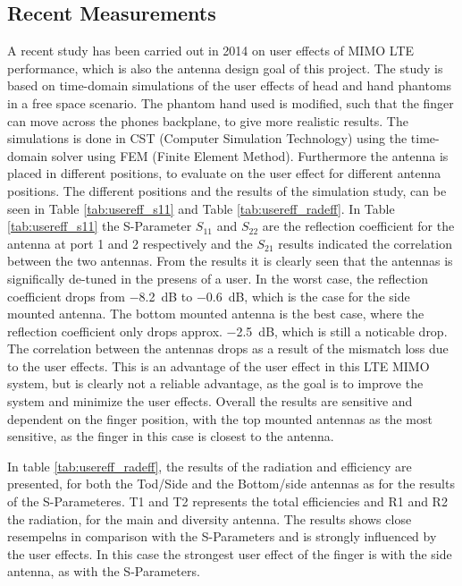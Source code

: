 \subsection{Recent Measurements}
A recent study has been carried out in 2014 on user effects of MIMO LTE performance, which is also the antenna design goal of this project. The study is based on time-domain simulations of the user effects of head and hand phantoms in a free space scenario. The phantom hand used is modified, such that the finger can move across the phones backplane, to give more realistic results. The simulations is done in CST (Computer Simulation Technology) using the time-domain solver using FEM (Finite Element Method). Furthermore the antenna is placed in different positions, to evaluate on the user effect for different antenna positions. The different positions and the results of the simulation study, can be seen in Table \ref{tab:usereff_s11} and Table \ref{tab:usereff_radeff}. In Table \ref{tab:usereff_s11} the S-Parameter $S_{11}$ and $S_{22}$ are the reflection coefficient for the antenna at port 1 and 2 respectively and the $S_{21}$ results indicated the correlation between the two antennas. From the results it is clearly seen that the antennas is significally de-tuned in the presens of a user. In the worst case, the reflection coefficient drops from \SI{-8.2}{dB} to \SI{-0.6}{dB}, which is the case for the side mounted antenna. The bottom mounted antenna is the best case, where the reflection coefficient only drops approx. \SI{-2.5}{dB}, which is still a noticable drop. The correlation between the antennas drops as a result of the mismatch loss due to the user effects. This is an advantage of the user effect in this LTE MIMO system, but is clearly not a reliable advantage, as the goal is to improve the system and minimize the user effects. Overall the results are sensitive and dependent on the finger position, with the top mounted antennas as the most sensitive, as the finger in this case is closest to the antenna.


In table \ref{tab:usereff_radeff}, the results of the radiation and efficiency are presented, for both the Tod/Side and the Bottom/side antennas as for the results of the S-Parameteres. T1 and T2 represents the total efficiencies and R1 and R2 the radiation, for the main and diversity antenna. 
The results shows close resempelns in comparison with the S-Parameters and is strongly influenced by the user effects. In this case the strongest user effect of the finger is with the side antenna, as with the S-Parameters. \cite{Samantha2014UserEff}     

